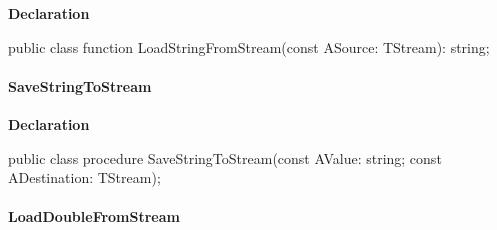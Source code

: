 \documentclass{report}
\newif\ifpdf
\begin{document}
\label{PasDoc_Serialize.TSerializable-LoadStringFromStream}
\begin{list}{}{
\setlength{\itemindent}{0cm}
\setlength{\listparindent}{0cm}
\setlength{\leftmargin}{\evensidemargin}
\addtolength{\leftmargin}{\tmplength}
\settowidth{\labelsep}{X}
\addtolength{\leftmargin}{\labelsep}
\setlength{\labelwidth}{\tmplength}
}
\item[\textbf{Declaration}\hfill]
\ifpdf
\begin{flushleft}
\fi
\begin{ttfamily}
public class function LoadStringFromStream(const ASource: TStream): string;\end{ttfamily}

\ifpdf
\end{flushleft}
\fi

\end{list}
\paragraph*{SaveStringToStream}\hspace*{\fill}

\label{PasDoc_Serialize.TSerializable-SaveStringToStream}
\begin{list}{}{
\setlength{\itemindent}{0cm}
\setlength{\listparindent}{0cm}
\setlength{\leftmargin}{\evensidemargin}
\addtolength{\leftmargin}{\tmplength}
\settowidth{\labelsep}{X}
\addtolength{\leftmargin}{\labelsep}
\setlength{\labelwidth}{\tmplength}
}
\item[\textbf{Declaration}\hfill]
\ifpdf
\begin{flushleft}
\fi
\begin{ttfamily}
public class procedure SaveStringToStream(const AValue: string; const ADestination: TStream);\end{ttfamily}

\ifpdf
\end{flushleft}
\fi

\end{list}
\paragraph*{LoadDoubleFromStream}\hspace*{\fill}
\end{document}
